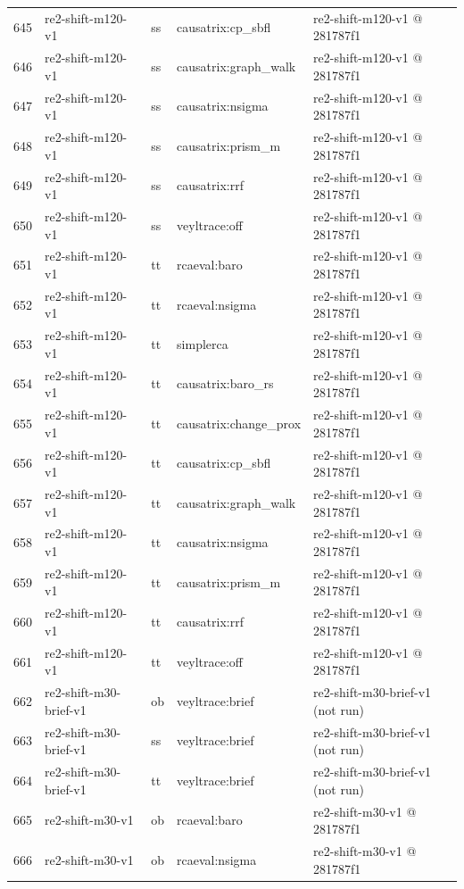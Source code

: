 \begin{longtable}{@{}r>{\raggedright\arraybackslash}p{87.0pt}>{\raggedright\arraybackslash}p{18.0pt}>{\raggedright\arraybackslash}p{63.0pt}>{\raggedright\arraybackslash}p{108.0pt}@{}}
645 & re2-shift-m120-v1 & ss & causatrix:cp\_sbfl & re2-shift-m120-v1 @ 281787f1 \\
646 & re2-shift-m120-v1 & ss & causatrix:graph\_walk & re2-shift-m120-v1 @ 281787f1 \\
647 & re2-shift-m120-v1 & ss & causatrix:nsigma & re2-shift-m120-v1 @ 281787f1 \\
648 & re2-shift-m120-v1 & ss & causatrix:prism\_m & re2-shift-m120-v1 @ 281787f1 \\
649 & re2-shift-m120-v1 & ss & causatrix:rrf & re2-shift-m120-v1 @ 281787f1 \\
650 & re2-shift-m120-v1 & ss & veyltrace:off & re2-shift-m120-v1 @ 281787f1 \\
651 & re2-shift-m120-v1 & tt & rcaeval:baro & re2-shift-m120-v1 @ 281787f1 \\
652 & re2-shift-m120-v1 & tt & rcaeval:nsigma & re2-shift-m120-v1 @ 281787f1 \\
653 & re2-shift-m120-v1 & tt & simplerca & re2-shift-m120-v1 @ 281787f1 \\
654 & re2-shift-m120-v1 & tt & causatrix:baro\_rs & re2-shift-m120-v1 @ 281787f1 \\
655 & re2-shift-m120-v1 & tt & causatrix:change\_prox & re2-shift-m120-v1 @ 281787f1 \\
656 & re2-shift-m120-v1 & tt & causatrix:cp\_sbfl & re2-shift-m120-v1 @ 281787f1 \\
657 & re2-shift-m120-v1 & tt & causatrix:graph\_walk & re2-shift-m120-v1 @ 281787f1 \\
658 & re2-shift-m120-v1 & tt & causatrix:nsigma & re2-shift-m120-v1 @ 281787f1 \\
659 & re2-shift-m120-v1 & tt & causatrix:prism\_m & re2-shift-m120-v1 @ 281787f1 \\
660 & re2-shift-m120-v1 & tt & causatrix:rrf & re2-shift-m120-v1 @ 281787f1 \\
661 & re2-shift-m120-v1 & tt & veyltrace:off & re2-shift-m120-v1 @ 281787f1 \\
662 & re2-shift-m30-brief-v1 & ob & veyltrace:brief & re2-shift-m30-brief-v1 (not run) \\
663 & re2-shift-m30-brief-v1 & ss & veyltrace:brief & re2-shift-m30-brief-v1 (not run) \\
664 & re2-shift-m30-brief-v1 & tt & veyltrace:brief & re2-shift-m30-brief-v1 (not run) \\
665 & re2-shift-m30-v1 & ob & rcaeval:baro & re2-shift-m30-v1 @ 281787f1 \\
666 & re2-shift-m30-v1 & ob & rcaeval:nsigma & re2-shift-m30-v1 @ 281787f1 \\

\end{longtable}
